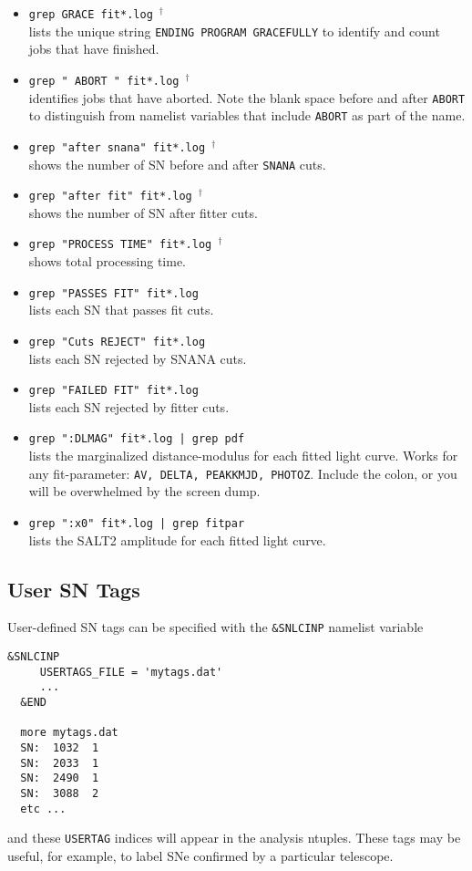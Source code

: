 \documentclass[12pt]{article}
\newcommand{\jobend}{\mbox{~$^\dagger$}}
\begin{document}
\begin{itemize}
%
  \item	{\tt grep GRACE fit*.log}{\jobend} \\
    	lists the unique string
   	{\tt ENDING PROGRAM GRACEFULLY} to identify and count
   	jobs that have finished.
%
  \item	{\tt grep " ABORT " fit*.log}{\jobend} \\
   	identifies jobs that have aborted. Note the
    	blank space before and after {\tt ABORT} to distinguish
    	from namelist variables that include {\tt ABORT}
	as part of the name.
%
 \item	{\tt grep "after snana" fit*.log}{\jobend} \\
	shows the number of SN before and after {\tt SNANA} cuts.
%
 \item	{\tt grep "after fit" fit*.log}{\jobend} \\
	shows the number of SN after fitter cuts.
%
 \item	{\tt grep "PROCESS TIME" fit*.log}{\jobend} \\
	shows total processing time.
%
\item 	{\tt grep "PASSES FIT" fit*.log} \\
	lists each SN that passes fit cuts.
%
 \item 	{\tt grep "Cuts REJECT" fit*.log} \\
	lists each SN rejected by SNANA cuts.
%
 \item 	{\tt grep "FAILED FIT" fit*.log} \\
	lists each SN rejected by fitter cuts.
%
 \item	{\tt grep ":DLMAG" fit*.log | grep pdf} \\
	lists the marginalized distance-modulus for each 
	fitted light curve. Works for any fit-parameter:
	{\tt AV, DELTA, PEAKKMJD, PHOTOZ}. 
	Include the colon, or you will be overwhelmed by the
	screen dump.
%
 \item	{\tt grep ":x0" fit*.log | grep fitpar} \\
	lists the SALT2 amplitude for each 
	fitted light curve.
\end{itemize}


\subsection{User SN Tags }
\label{subsec:usertags}

User-defined SN tags can be specified with the
{\tt \&SNLCINP} namelist variable
\begin{Verbatim}[frame=single]
  &SNLCINP
     USERTAGS_FILE = 'mytags.dat'
     ...
  &END

  more mytags.dat
  SN:  1032  1
  SN:  2033  1
  SN:  2490  1
  SN:  3088  2
  etc ...
\end{Verbatim}
%
and these {\tt USERTAG} indices will appear in 
the analysis ntuples. These tags may be useful,
for example, to label SNe confirmed by a particular telescope.
\end{document}
